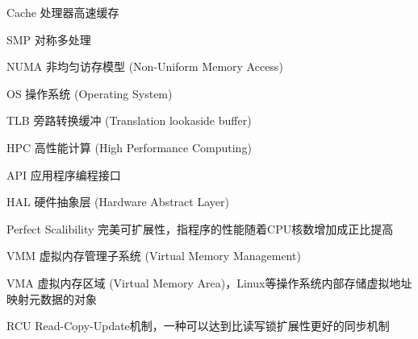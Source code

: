 \begin{denotation}

\item[Cache] 处理器高速缓存
\item[SMP] 对称多处理
\item[NUMA] 非均匀访存模型 (Non-Uniform Memory Access)
\item[OS] 操作系统 (Operating System)
\item[TLB] 旁路转换缓冲 (Translation lookaside buffer)
\item[HPC] 高性能计算 (High Performance Computing)
\item[API] 应用程序编程接口
\item[HAL] 硬件抽象层 (Hardware Abstract Layer)
\item[Perfect Scalibility]
	完美可扩展性，指程序的性能随着CPU核数增加成正比提高
\item[VMM] 虚拟内存管理子系统 (Virtual Memory Management)
\item[VMA] 虚拟内存区域 (Virtual Memory
	Area)，Linux等操作系统内部存储虚拟地址映射元数据的对象
\item[RCU]
	Read-Copy-Update机制，一种可以达到比读写锁扩展性更好的同步机制

\end{denotation}
